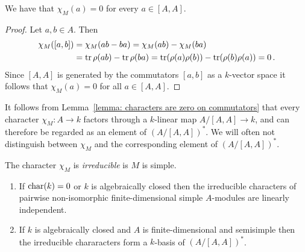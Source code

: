 \begin{lemma}
  \label{lemma: characters are zero on commutators}
  We have that $\chi_M(a) = 0$ for every $a \in [A,A]$.
\end{lemma}


\begin{proof}
  Let $a, b \in A$.
  Then
  \begin{align*}
        \chi_M([a,b])
    &=  \chi_M(ab - ba)
     =  \chi_M(ab) - \chi_M(ba) \\
    &=  \operatorname{tr} \rho(ab) - \operatorname{tr} \rho(ba)
     =  \operatorname{tr}( \rho(a) \rho(b) ) - \operatorname{tr}( \rho(b) \rho(a) )
     =  0 \,.
  \end{align*}
  Since $[A,A]$ is generated by the commutators $[a,b]$ as a $k$-vector space it follows that $\chi_M(a) = 0$ for all $a \in [A,A]$.
\end{proof}


\begin{fluff}
  It follows from Lemma~\ref{lemma: characters are zero on commutators} that every character $\chi_M \colon A \to k$ factors through a $k$-linear map $A/[A,A] \to k$, and can therefore be regarded as an element of $(A/[A,A])^*$.
  We will often not distinguish between $\chi_M$ and the corresponding element of $(A/[A,A])^*$.
\end{fluff}


\begin{definition}
  The character $\chi_M$ is \emph{irreducible} is $M$ is simple.
\end{definition}


\begin{theorem}
  \leavevmode
  \label{theorem: characters as a basis}
  \begin{enumerate}
    \item
      \label{enumerate: characters are linearly independent}
      If $\operatorname{char}(k) = 0$ or $k$ is algebraically closed then the irreducible characters of pairwise non-isomorphic finite-dimensional simple $A$-modules are linearly independent.
    \item
      If $k$ is algebraically closed and $A$ is finite-dimensional and semisimple then the irreducible chararacters form a $k$-basis of $(A/[A,A])^*$.
  \end{enumerate}
\end{theorem}



